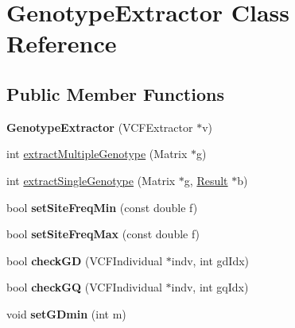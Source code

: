 \hypertarget{classGenotypeExtractor}{\section{Genotype\-Extractor Class Reference}
\label{classGenotypeExtractor}
}
\subsection*{Public Member Functions}
\begin{DoxyCompactItemize}
\item 
\hypertarget{classGenotypeExtractor_a6ff59c48d46fed9aa928d90bf7500e39}{{\bfseries Genotype\-Extractor} (V\-C\-F\-Extractor $\ast$v)}\label{classGenotypeExtractor_a6ff59c48d46fed9aa928d90bf7500e39}

\item 
int \hyperlink{classGenotypeExtractor_a404348b817a6844d0a88983cb46c326c}{extract\-Multiple\-Genotype} (Matrix $\ast$g)
\item 
int \hyperlink{classGenotypeExtractor_a84d6e7394ece8f32ffcc08377a1db30e}{extract\-Single\-Genotype} (Matrix $\ast$g, \hyperlink{classResult}{Result} $\ast$b)
\item 
\hypertarget{classGenotypeExtractor_aef7a95ffb96b9ad7ce1f4cc4858fbc22}{bool {\bfseries set\-Site\-Freq\-Min} (const double f)}\label{classGenotypeExtractor_aef7a95ffb96b9ad7ce1f4cc4858fbc22}

\item 
\hypertarget{classGenotypeExtractor_a0777da1c25ac6388d0c110827bb92b8b}{bool {\bfseries set\-Site\-Freq\-Max} (const double f)}\label{classGenotypeExtractor_a0777da1c25ac6388d0c110827bb92b8b}

\item 
\hypertarget{classGenotypeExtractor_aa4708bbdd89f464b67eb4be1dd8bfad3}{bool {\bfseries check\-G\-D} (V\-C\-F\-Individual $\ast$indv, int gd\-Idx)}\label{classGenotypeExtractor_aa4708bbdd89f464b67eb4be1dd8bfad3}

\item 
\hypertarget{classGenotypeExtractor_ae93e2c35f08df71764cae8921dd5019d}{bool {\bfseries check\-G\-Q} (V\-C\-F\-Individual $\ast$indv, int gq\-Idx)}\label{classGenotypeExtractor_ae93e2c35f08df71764cae8921dd5019d}

\item 
\hypertarget{classGenotypeExtractor_a2f98e3e13638f430362d0b8099c379d2}{void {\bfseries set\-G\-Dmin} (int m)}\label{classGenotypeExtractor_a2f98e3e13638f430362d0b8099c379d2}


\end{DoxyCompactItemize}
